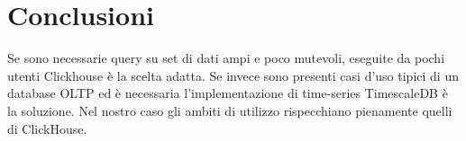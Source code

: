 \section{Conclusioni}
Se sono necessarie query su set di dati ampi e poco mutevoli, eseguite da pochi utenti Clickhouse è la scelta adatta.
Se invece sono presenti casi d’uso tipici di un database OLTP ed è necessaria l'implementazione di time-series TimescaleDB è la soluzione.
Nel nostro caso gli ambiti di utilizzo rispecchiano pienamente quelli di ClickHouse.





